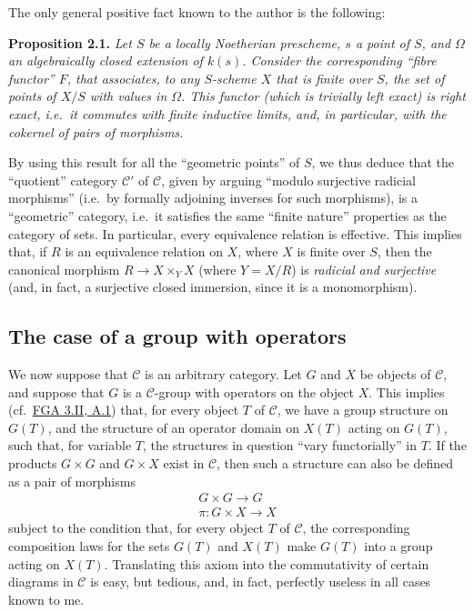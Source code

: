 \documentclass{article}
\newenvironment{itenv}[1]
  {\phantomsection\par\smallskip\noindent\textbf{#1.}\itshape}
  {\par\smallskip}
\newcommand{\oldpage}[1]{\marginpar{\footnotesize$\Big\vert$ \textit{p.~#1}}}
\theoremstyle{definition}
\theoremstyle{definition}
\theoremstyle{definition}
\theoremstyle{definition}
\theoremstyle{remark}
\begin{document}
The only general positive fact known to the author is the following:

\leavevmode{}%
\begin{itenv}{Proposition 2.1}
Let \(S\) be a locally Noetherian prescheme, \(s\) a point of \(S\), and \(\Omega\) an algebraically closed extension of \(k(s)\).
\oldpage{212-06}Consider the corresponding ``fibre functor'' \(F\), that associates, to any \(S\)-scheme \(X\) that is finite over \(S\), the set of points of \(X/S\) with values in \(\Omega\).
This functor (which is trivially left exact) is \emph{right exact}, i.e.~it commutes with finite inductive limits, and, in particular, with the cokernel of pairs of morphisms.

\end{itenv}

By using this result for all the ``geometric points'' of \(S\), we thus deduce that the ``quotient'' category \({\mathcal{C}}'\) of \({\mathcal{C}}\), given by arguing ``modulo surjective radicial morphisms'' (i.e.~by formally adjoining inverses for such morphisms), is a ``geometric'' category, i.e.~it satisfies the same ``finite nature'' properties as the category of sets.
In particular, every equivalence relation is effective.
This implies that, if \(R\) is an equivalence relation on \(X\), where \(X\) is finite over \(S\), then the canonical morphism \(R\to X\times_Y X\) (where \(Y=X/R\)) is \emph{radicial and surjective} (and, in fact, a surjective closed immersion, since it is a monomorphism).

\hypertarget{fga-3-iii-section-3}{%
\subsection{The case of a group with operators}\label{fga-3-iii-section-3}}

We now suppose that \({\mathcal{C}}\) is an arbitrary category.
Let \(G\) and \(X\) be objects of \({\mathcal{C}}\), and suppose that \(G\) is a \({\mathcal{C}}\)-group with operators on the object \(X\).
This implies (cf.~\protect\hyperlink{fga-3-ii-section-A.1}{FGA 3.II, A.1}) that, for every object \(T\) of \({\mathcal{C}}\), we have a group structure on \(G(T)\), and the structure of an operator domain on \(X(T)\) acting on \(G(T)\), such that, for variable \(T\), the structures in question ``vary functorially'' in \(T\).
If the products \(G\times G\) and \(G\times X\) exist in \({\mathcal{C}}\), then such a structure can also be defined as a pair of morphisms
\[
  \begin{gathered}
    G\times G\to G
  \\\pi\colon G\times X\to X
  \end{gathered}
\]
subject to the condition that, for every object \(T\) of \({\mathcal{C}}\), the corresponding composition laws for the sets \(G(T)\) and \(X(T)\) make \(G(T)\) into a group acting on \(X(T)\).
Translating this axiom into the commutativity of certain diagrams in \({\mathcal{C}}\) is easy, but tedious, and, in fact, perfectly useless in all cases known to me.
\end{document}
